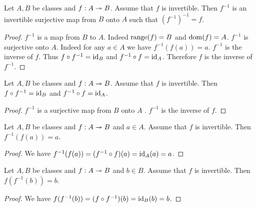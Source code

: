 \documentclass[10pt]{article}
\begin{document}
  \begin{forthel}
    \begin{proposition}
      Let $A, B$ be classes and $f : A \twoheadrightarrow B$.
      Assume that $f$ is invertible.
      Then $f^{-1}$ is an invertible surjective map from $B$ onto $A$ such that $(f^{-1})^{-1} = f$.
    \end{proposition}
    \begin{proof}
      $f^{-1}$ is a map from $B$ to $A$.
      Indeed $\textrm{range}(f) = B$ and $\operatorname{dom}(f) = A$.
      $f^{-1}$ is surjective onto $A$.
      Indeed for any $a \in A$ we have $f^{-1}(f(a)) = a$.
      $f^{-1}$ is the inverse of $f$.
      Thus $f \circ f^{-1} = \textrm{id}_{B}$ and $f^{-1} \circ f = \textrm{id}_{A}$.
      Therefore $f$ is the inverse of $f^{-1}$.
    \end{proof}
  \end{forthel}

  \begin{forthel}
    \begin{proposition}
      Let $A, B$ be classes and $f : A \twoheadrightarrow B$.
      Assume that $f$ is invertible.
      Then $f \circ f^{-1} = \textrm{id}_{B}$ and $f^{-1} \circ f = \textrm{id}_{A}$.
    \end{proposition}
    \begin{proof}
      $f^{-1}$ is a surjective map from $B$ onto $A$ .
      $f^{-1}$ is the inverse of $f$.
    \end{proof}
  \end{forthel}

  \begin{forthel}
    \begin{proposition}
      Let $A, B$ be classes and $f : A \twoheadrightarrow B$ and $a \in A$.
      Assume that $f$ is invertible.
      Then $f^{-1}(f(a)) = a$.
    \end{proposition}
    \begin{proof}
      We have $f^{-1}(f(a)) = (f^{-1} \circ f)(a) = \textrm{id}_{A}(a) = a$.
    \end{proof}

    \begin{proposition}
      Let $A, B$ be classes and $f : A \twoheadrightarrow B$ and $b \in B$.
      Assume that $f$ is invertible.
      Then $f(f^{-1}(b)) = b$.
    \end{proposition}
    \begin{proof}
      We have
      $f(f^{-1}(b))
        = (f \circ f^{-1})(b)
        = \textrm{id}_{B}(b)
        = b$.
    \end{proof}
  \end{forthel}
\end{document}

